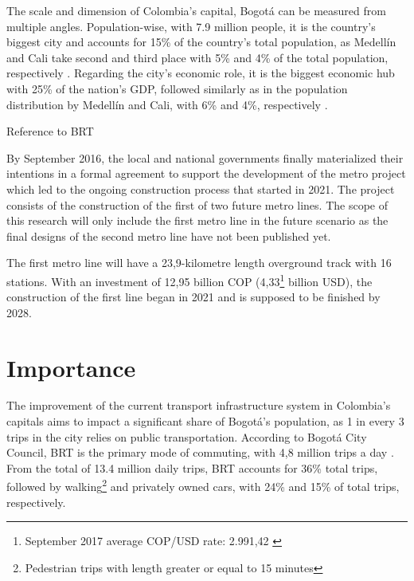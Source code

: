 \documentclass[12pt, a4paper]{report}
\begin{document}
The scale and dimension of Colombia's capital, Bogot\'{a} can be measured from multiple angles. Population-wise, with 7.9 million people, it is the country's biggest city and accounts for 15\% of the country's total population, as Medell\'{i}n and Cali take second and third place with 5\% and 4\% of the total population, respectively \citep{daneProyeccionesPoblacionPopulation2023}. Regarding the city's economic role, it is the biggest economic hub with 25\% of the nation's GDP, followed similarly as in the population distribution by Medell\'{i}n and Cali, with 6\% and 4\%, respectively \citep{daneCuentasNacionalesDepartamentales2023}.

Reference to BRT

By September 2016, the local and national governments finally materialized their intentions in a formal agreement to support the development of the metro project which led to the ongoing construction process that started in 2021. The project consists of the construction of the first of two future metro lines. The scope of this research will only include the first metro line in the future scenario as the final designs of the second metro line have not been published yet. 

The first metro line will have a 23,9-kilometre length overground track with 16 stations. With an investment of 12,95 billion COP (4,33\footnote{September 2017 average COP/USD rate: 2.991,42 \citep{bancodelarepublicaTasaCambioRepresentativa2023}} billion USD), the construction of the first line began in 2021 and is supposed to be finished by 2028.



\section{Importance}

The improvement of the current transport infrastructure system in Colombia's capitals aims to impact a significant share of Bogot\'{a}'s population, as 1 in every 3 trips in the city relies on public transportation. According to Bogot\'{a} City Council, BRT is the primary mode of commuting, with 4,8 million trips a day \citep{alcaldiadebogotaEncuestaMovilidad20192019}. From the total of 13.4 million daily trips, BRT accounts for 36\% total trips, followed by walking\footnote{Pedestrian trips with length greater or equal to 15 minutes} and privately owned cars, with 24\% and 15\% of total trips, respectively.
\end{document}
